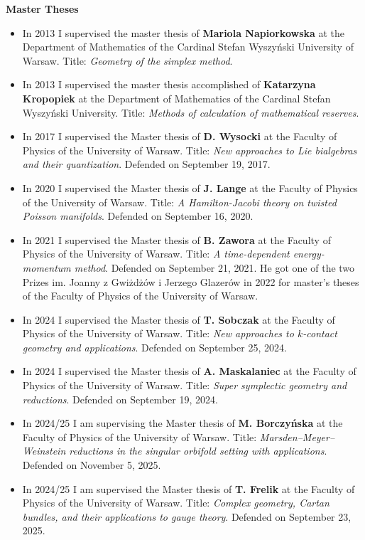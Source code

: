 \documentclass[12pt,reqno]{amsbook}
\begin{document}
\centerline{\bf Master Theses}
\begin{itemize}

\item In 2013 I supervised the master thesis of {\bf Mariola Napiorkowska} at the Department of Mathematics of the Cardinal Stefan Wyszy\'nski University of Warsaw. Title: {\it Geometry of the simplex method}.

\item In 2013 I supervised the master thesis accomplished of {\bf Katarzyna Kropopiek} at the Department of Mathematics of the Cardinal Stefan Wyszy\'nski University. Title: {\it Methods of calculation of mathematical reserves}.

\item In 2017 I supervised the Master thesis of {\bf D. Wysocki}  at the Faculty of Physics of the University of Warsaw. Title: {\it New approaches to Lie bialgebras and their quantization}. Defended on September 19, 2017.

\item In 2020 I supervised the Master thesis of {\bf J. Lange}  at the Faculty of Physics of the University of Warsaw. Title: {\it A Hamilton-Jacobi theory on twisted Poisson manifolds}. Defended on September 16, 2020.


\item In 2021 I supervised the Master thesis of {\bf B. Zawora}  at the Faculty of Physics of the University of Warsaw. Title: {\it A time-dependent energy-momentum method}. Defended on September 21, 2021. He got one of the two Prizes im. Joanny z Gwiżdżów i Jerzego Glazerów in 2022 for master's theses of the Faculty of Physics of the University of Warsaw.
\item In 2024 I supervised the Master thesis of {\bf T. Sobczak}  at the Faculty of Physics of the University of Warsaw. Title: {\it New approaches to $k$-contact geometry and applications}. Defended on September 25, 2024. 
\item In 2024 I supervised the Master thesis of {\bf A. Maskalaniec}  at the Faculty of Physics of the University of Warsaw. Title: {\it Super symplectic geometry and reductions}. Defended on September 19, 2024. 
\item In 2024/25 I am supervising the Master thesis of {\bf M. Borczy\'nska}  at the Faculty of Physics of the University of Warsaw. Title: {\it Marsden--Meyer--Weinstein reductions in the singular orbifold setting with applications}. Defended on November 5, 2025. 
\item In 2024/25 I am supervised the Master thesis of {\bf T. Frelik }  at the Faculty of Physics of the University of Warsaw. Title: {\it Complex geometry, Cartan bundles, and their applications to gauge theory}. Defended on September 23, 2025. 
\end{itemize}
\end{document}
